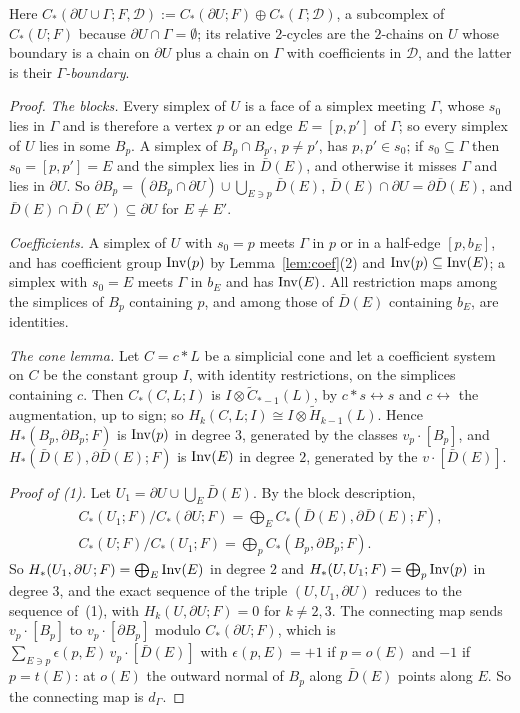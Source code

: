 Here $C_*(\partial U\cup\Gamma;F,\mathcal D):=C_*(\partial U;F)\oplus C_*(\Gamma;\mathcal D)$, a subcomplex of $C_*(U;F)$
because $\partial U\cap\Gamma=\emptyset$; its relative $2$-cycles are the $2$-chains on $U$ whose boundary is a chain on
$\partial U$ plus a chain on $\Gamma$ with coefficients in $\mathcal D$, and the latter is their \emph{$\Gamma$-boundary}.

\begin{proof}
\emph{The blocks.} Every simplex of $U$ is a face of a simplex meeting $\Gamma$, whose $s_0$ lies in $\Gamma$ and is
therefore a vertex $p$ or an edge $E=[p,p']$ of $\Gamma$; so every simplex of $U$ lies in some $B_p$. A simplex of $B_p\cap B_{p'}$, $p\ne p'$, has $p,p'\in s_0$;
if $s_0\subseteq\Gamma$ then $s_0=[p,p']=E$ and the simplex lies in $\bar D(E)$, and otherwise it misses $\Gamma$
and lies in $\partial U$. So $\partial B_p=(\partial B_p\cap\partial U)\cup\bigcup_{E\ni p}\bar D(E)$,
$\bar D(E)\cap\partial U=\partial\bar D(E)$, and $\bar D(E)\cap\bar D(E')\subseteq\partial U$ for $E\ne E'$.

\emph{Coefficients.} A simplex of $U$ with $s_0=p$ meets $\Gamma$ in $p$ or in a half-edge $[p,b_E]$, and has
coefficient group $\operatorname{Inv}(p)$ by Lemma~\ref{lem:coef}(2) and $\operatorname{Inv}(p)\subseteq\operatorname{Inv}(E)$; a simplex with $s_0=E$
meets $\Gamma$ in $b_E$ and has $\operatorname{Inv}(E)$. All restriction maps among the simplices of $B_p$ containing $p$, and among
those of $\bar D(E)$ containing $b_E$, are identities.

\emph{The cone lemma.} Let $C=c*L$ be a simplicial cone and let a coefficient system on $C$ be the constant group $I$,
with identity restrictions, on the simplices containing $c$. Then $C_*(C,L;I)$ is $I\otimes\widetilde C_{*-1}(L)$, by
$c*s\leftrightarrow s$ and $c\leftrightarrow$ the augmentation, up to sign; so $H_k(C,L;I)\cong
I\otimes\widetilde H_{k-1}(L)$. Hence $H_*(B_p,\partial B_p;F)$ is $\operatorname{Inv}(p)$ in degree $3$, generated by the classes
$v_p\cdot[B_p]$, and $H_*(\bar D(E),\partial\bar D(E);F)$ is $\operatorname{Inv}(E)$ in degree $2$, generated by the $v\cdot[\bar D(E)]$.

\emph{Proof of (1).} Let $U_1=\partial U\cup\bigcup_E\bar D(E)$. By the block description,
\begin{gather*}
C_*(U_1;F)/C_*(\partial U;F)=\bigoplus_EC_*(\bar D(E),\partial\bar D(E);F),\\
C_*(U;F)/C_*(U_1;F)=\bigoplus_pC_*(B_p,\partial B_p;F).
\end{gather*}
So $H_*(U_1,\partial U;F)=\bigoplus_E\operatorname{Inv}(E)$ in degree $2$ and
$H_*(U,U_1;F)=\bigoplus_p\operatorname{Inv}(p)$ in degree $3$, and the exact sequence of the triple $(U,U_1,\partial U)$ reduces to
the sequence of~(1), with $H_k(U,\partial U;F)=0$ for $k\ne2,3$. The connecting map sends $v_p\cdot[B_p]$ to
$v_p\cdot[\partial B_p]$ modulo $C_*(\partial U;F)$, which is $\sum_{E\ni p}\epsilon(p,E)\,v_p\cdot[\bar D(E)]$ with
$\epsilon(p,E)=+1$ if $p=o(E)$ and $-1$ if $p=t(E)$: at $o(E)$ the outward normal of $B_p$ along $\bar D(E)$ points along
$E$. So the connecting map is $d_\Gamma$.


\end{proof}
